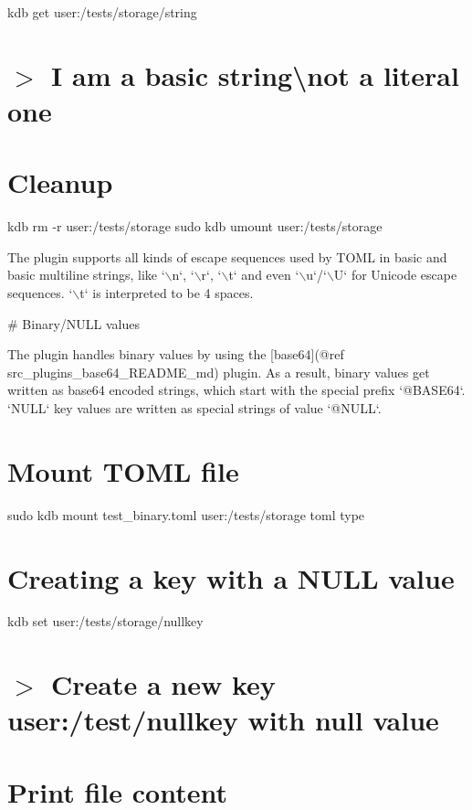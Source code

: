 kdb get \textquotesingle{}user\+:/tests/storage/string\textquotesingle{} \hypertarget{autotoc_md635_autotoc_md688}{}\section{$>$ I am a basic string\textbackslash{}not a literal one}\label{autotoc_md635_autotoc_md688}
\hypertarget{autotoc_md635_autotoc_md689}{}\section{Cleanup}\label{autotoc_md635_autotoc_md689}
kdb rm -\/r user\+:/tests/storage sudo kdb umount user\+:/tests/storage 
\begin{DoxyCode}
The plugin supports all kinds of escape sequences used by TOML in basic and basic multiline strings, like
       `\(\backslash\)n`, `\(\backslash\)r`, `\(\backslash\)t` and
even `\(\backslash\)u`/`\(\backslash\)U` for Unicode escape sequences. `\(\backslash\)t` is interpreted to be 4 spaces.

# Binary/NULL values

The plugin handles binary values by using the [base64](@ref src\_plugins\_base64\_README\_md) plugin.
As a result, binary values get written as base64 encoded strings, which start with the special prefix
       `@BASE64`.
`NULL` key values are written as special strings of value `@NULL`.
\end{DoxyCode}
 \hypertarget{autotoc_md635_autotoc_md690}{}\section{Mount T\+O\+M\+L file}\label{autotoc_md635_autotoc_md690}
sudo kdb mount test\+\_\+binary.\+toml user\+:/tests/storage toml type\hypertarget{autotoc_md635_autotoc_md691}{}\section{Creating a key with a N\+U\+L\+L value}\label{autotoc_md635_autotoc_md691}
kdb set \textquotesingle{}user\+:/tests/storage/nullkey\textquotesingle{} \hypertarget{autotoc_md635_autotoc_md692}{}\section{$>$ Create a new key user\+:/test/nullkey with null value}\label{autotoc_md635_autotoc_md692}
\hypertarget{autotoc_md635_autotoc_md693}{}\section{Print file content}\label{autotoc_md635_autotoc_md693}
